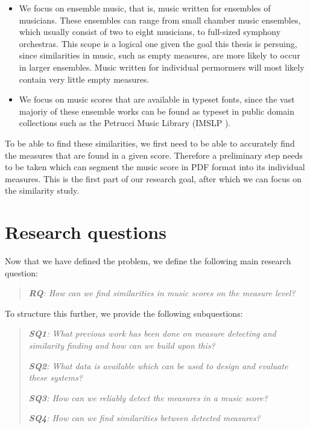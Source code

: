 \begin{itemize}
    \item We focus on ensemble music, that is, music written for ensembles of musicians. These ensembles can range from small chamber music ensembles, which usually consist of two to eight musicians, to full-sized symphony orchestras. This scope is a logical one given the goal this thesis is persuing, since similarities in music, such as empty measures, are more likely to occur in larger ensembles. Music written for individual permormers will most likely contain very little empty measures.
    \item We focus on music scores that are available in typeset fonts, since the vast majoriy of these ensemble works can be found as typeset in public domain collections such as the Petrucci Music Library (IMSLP \citep{IMSLP}).
\end{itemize}

To be able to find these similarities, we first need to be able to accurately find the measures that are found in a given score. Therefore a preliminary step needs to be taken which can segment the music score in PDF format into its individual measures. This is the first part of our research goal, after which we can focus on the similarity study.

\section{Research questions}\label{sec:introduction-research-questions}
Now that we have defined the problem, we define the following main research question:

\begin{quote}
    {\itshape \textbf{RQ}: How can we find similarities in music scores on the measure level?}
\end{quote}

\noindent To structure this further, we provide the following subquestions:

\begin{quote}
    {\itshape \textbf{SQ1}: What previous work has been done on measure detecting and similarity finding and how can we build upon this?}

    {\itshape \textbf{SQ2}: What data is available which can be used to design and evaluate these systems?}

    {\itshape \textbf{SQ3}: How can we reliably detect the measures in a music score?}

    {\itshape \textbf{SQ4}: How can we find similarities between detected measures?}
\end{quote}

